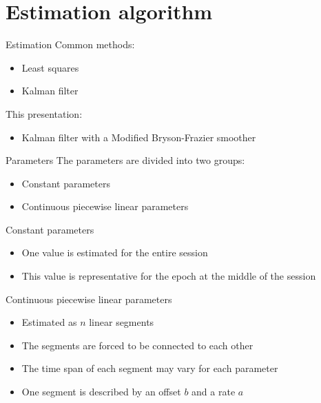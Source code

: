\documentclass[14pt,table,t, c]{beamer}
\begin{document}
\part{Estimation algorithm}

\begin{frame}{Estimation}
Common methods:
\begin{itemize}
\item Least squares 
\item Kalman filter
\end{itemize}
\vspace*{\baselineskip}
This presentation:
\begin{itemize}
  \item Kalman filter with a Modified Bryson-Frazier smoother
\end{itemize} 
\end{frame}

\begin{frame}{Parameters}
The parameters are divided into two groups:
\begin{itemize}
  \item Constant parameters
  \item Continuous piecewise linear parameters
\end{itemize}
\end{frame}

\begin{frame}{Constant parameters}
\begin{itemize}
  \item One value is estimated for the entire session
  \item This value is representative for the epoch at the middle of the session
\end{itemize}
\end{frame}

\begin{frame}{Continuous piecewise linear parameters}
\begin{itemize}
  \item Estimated as $n$ linear segments
  \item The segments are forced to be connected to each other
  \item The time span of each segment may vary for each parameter
  \item One segment is described by an offset $b$ and a rate $a$
\end{itemize}
\end{frame}
\end{document}
